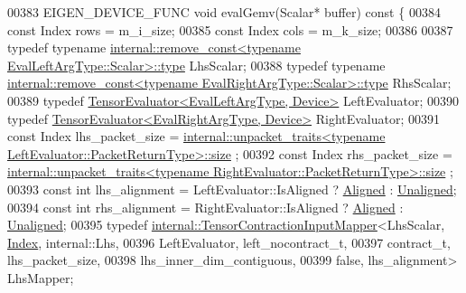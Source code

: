 \begin{DoxyCode}
00383   EIGEN\_DEVICE\_FUNC \textcolor{keywordtype}{void} evalGemv(Scalar* buffer)\textcolor{keyword}{ const }\{
00384     \textcolor{keyword}{const} Index rows = m\_i\_size;
00385     \textcolor{keyword}{const} Index cols = m\_k\_size;
00386 
00387     \textcolor{keyword}{typedef} \textcolor{keyword}{typename} 
      \hyperlink{group___sparse_core___module}{internal::remove\_const<typename EvalLeftArgType::Scalar>::type}
       LhsScalar;
00388     \textcolor{keyword}{typedef} \textcolor{keyword}{typename} 
      \hyperlink{group___sparse_core___module}{internal::remove\_const<typename EvalRightArgType::Scalar>::type}
       RhsScalar;
00389     \textcolor{keyword}{typedef} \hyperlink{struct_eigen_1_1_tensor_evaluator}{TensorEvaluator<EvalLeftArgType, Device>} LeftEvaluator;
00390     \textcolor{keyword}{typedef} \hyperlink{struct_eigen_1_1_tensor_evaluator}{TensorEvaluator<EvalRightArgType, Device>} 
      RightEvaluator;
00391     \textcolor{keyword}{const} Index lhs\_packet\_size = 
      \hyperlink{struct_eigen_1_1internal_1_1unpacket__traits}{internal::unpacket\_traits<typename LeftEvaluator::PacketReturnType>::size}
      ;
00392     \textcolor{keyword}{const} Index rhs\_packet\_size = 
      \hyperlink{struct_eigen_1_1internal_1_1unpacket__traits}{internal::unpacket\_traits<typename RightEvaluator::PacketReturnType>::size}
      ;
00393     \textcolor{keyword}{const} \textcolor{keywordtype}{int} lhs\_alignment = LeftEvaluator::IsAligned ? \hyperlink{group__enums_gga45fe06e29902b7a2773de05ba27b47a1ad37d4c71425bb286e9b4103830538fbf}{Aligned} : 
      \hyperlink{group__enums_gga45fe06e29902b7a2773de05ba27b47a1ac935220b4c844108e183ebe30a4d5204}{Unaligned};
00394     \textcolor{keyword}{const} \textcolor{keywordtype}{int} rhs\_alignment = RightEvaluator::IsAligned ? \hyperlink{group__enums_gga45fe06e29902b7a2773de05ba27b47a1ad37d4c71425bb286e9b4103830538fbf}{Aligned} : 
      \hyperlink{group__enums_gga45fe06e29902b7a2773de05ba27b47a1ac935220b4c844108e183ebe30a4d5204}{Unaligned};
00395     \textcolor{keyword}{typedef} \hyperlink{class_eigen_1_1internal_1_1_tensor_contraction_input_mapper}{internal::TensorContractionInputMapper}<LhsScalar, 
      \hyperlink{namespace_eigen_a62e77e0933482dafde8fe197d9a2cfde}{Index}, internal::Lhs,
00396                                                    LeftEvaluator, left\_nocontract\_t,
00397                                                    contract\_t, lhs\_packet\_size,
00398                                                    lhs\_inner\_dim\_contiguous,
00399                                                    \textcolor{keyword}{false}, lhs\_alignment> LhsMapper;

\end{DoxyCode}
